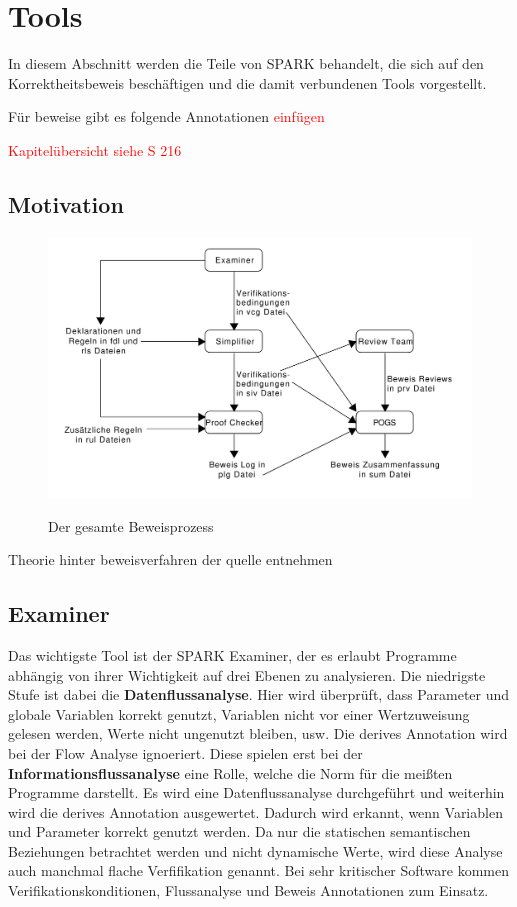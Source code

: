 
\section{Tools}
\label{sec:tools}
In diesem Abschnitt werden die Teile von SPARK behandelt, die sich auf den Korrektheitsbeweis beschäftigen und die damit verbundenen Tools vorgestellt.

Für beweise gibt es folgende Annotationen
\textcolor{red}{einfügen}

\textcolor{red}{Kapitelübersicht siehe S 216}

\subsection{Motivation}
\begin{figure}[h]
\includegraphics[width=\textwidth{}]{images/ProofProcess.pdf}
\label{fig:proofProcess}
\caption{Der gesamte Beweisprozess}
\end{figure}
Theorie hinter beweisverfahren der quelle entnehmen

\subsection{Examiner}
\label{sec:examiner}
Das wichtigste Tool ist der SPARK Examiner, der es erlaubt Programme abhängig von ihrer Wichtigkeit auf drei Ebenen zu analysieren. Die niedrigste Stufe ist dabei die \textbf{Datenflussanalyse}. Hier wird überprüft, dass Parameter und globale Variablen korrekt genutzt, Variablen nicht vor einer Wertzuweisung gelesen werden, Werte nicht ungenutzt bleiben, usw. Die derives Annotation wird bei der Flow Analyse ignoeriert.
Diese spielen erst bei der \textbf{Informationsflussanalyse} eine Rolle, welche die Norm für die meißten Programme darstellt. Es wird eine Datenflussanalyse durchgeführt und weiterhin wird die derives Annotation ausgewertet. Dadurch wird erkannt, wenn Variablen und Parameter korrekt genutzt werden. Da nur die statischen semantischen Beziehungen betrachtet werden und nicht dynamische Werte, wird diese Analyse auch manchmal flache Verfifikation genannt.
Bei sehr kritischer Software kommen Verifikationskonditionen, Flussanalyse und Beweis Annotationen zum Einsatz.


